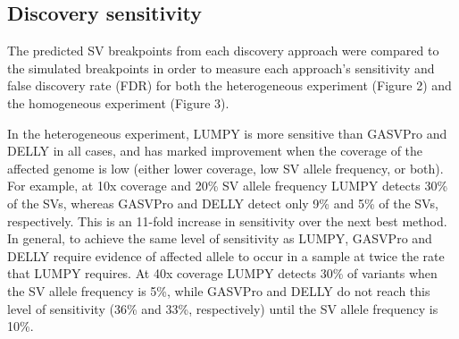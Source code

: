\documentclass[10pt]{bmc_article}
\newenvironment{bmcformat}{\begin{raggedright}\baselineskip20pt\sloppy\setboolean{publ}{false}}{\end{raggedright}\baselineskip20pt\sloppy}
\begin{document}
\begin{bmcformat}

\subsection*{Discovery sensitivity}
The predicted SV breakpoints from each discovery approach were compared to the
simulated breakpoints in order to measure each approach’s sensitivity and false
discovery rate (FDR) for both the heterogeneous experiment (Figure 2) and the
homogeneous experiment (Figure 3).

In the heterogeneous experiment, LUMPY is more sensitive than GASVPro and DELLY
in all cases, and has marked improvement when the coverage of the affected
genome is low (either lower coverage, low SV allele frequency, or both).  For
example, at 10x coverage and 20\% SV allele frequency LUMPY detects 30\% of the
SVs, whereas GASVPro and DELLY detect only 9\% and 5\% of the SVs, respectively.
This is an 11-fold increase in sensitivity over the next best method.  In
general, to achieve the same level of sensitivity as LUMPY, GASVPro and DELLY
require evidence of affected allele to occur in a sample at twice the rate that
LUMPY requires.  At 40x coverage LUMPY detects 30\% of variants when the SV
allele frequency is 5\%, while GASVPro and DELLY do not reach this level of
sensitivity (36\% and 33\%, respectively) until the SV allele frequency is 10\%.


\end{bmcformat}
\end{document}
